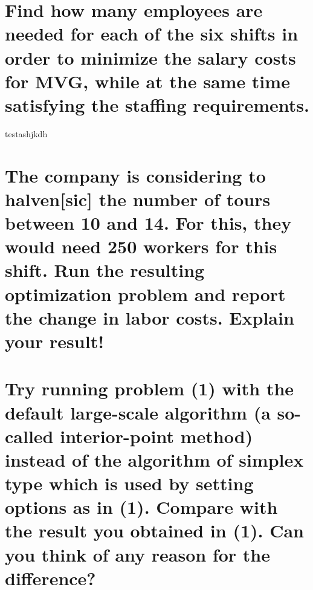 


  \section{Find how many employees are needed for each of the six shifts in order to
minimize the salary costs for MVG, while at the same time satisfying the
staffing requirements.}
 testashjkdh
\section{The company is considering to halven[sic] the number of tours between 10 and
14. For this, they would need 250 workers for this shift. Run the resulting
optimization problem and report the change in labor costs. Explain your
result!}
\section{Try running problem (1) with the default large-scale algorithm (a so-called
interior-point method) instead of the algorithm of simplex type which is
used by setting options as in (1). Compare with the
result you obtained in (1). Can you think of any reason for the difference?}

